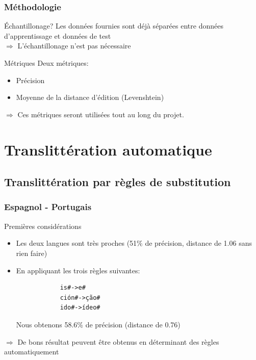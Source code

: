 \documentclass{beamer}
\begin{document}
\begin{frame}
\frametitle{Méthodologie}

	\begin{block}{Échantillonage?}
	Les données fournies sont déjà séparées entre données d'apprentissage et données de test\\
	$\Longrightarrow$ L'échantillonage n'est pas nécessaire
	\end{block}

	\begin{block}{Métriques}
	Deux métriques:
		\begin{itemize}
            \item Précision
            \item Moyenne de la distance d'édition (Levenshtein)
		\end{itemize}		
	\end{block}
	
	\begin{alertblock}{}
	$\Longrightarrow$ Ces métriques seront utilisées tout au long du projet.
	\end{alertblock}	
	
\end{frame}

\section{Translittération automatique}

\begin{frame}
\end{frame}

\subsection{Translittération par règles de substitution}

\begin{frame}[fragile]
	\frametitle{Espagnol - Portugais}

	\begin{block}{Premières considérations}
		\begin{itemize}
		\item Les deux langues sont très proches (51\% de précision, distance de 1.06 sans rien faire)
		\item En appliquant les trois règles suivantes: {\scriptsize \begin{verbatim}
			is#->e#
			ción#->ção#
			ido#->ídeo#
			\end{verbatim}}
            Nous obtenons 58.6\% de précision (distance de 0.76)
		\end{itemize}
	\end{block}

	\begin{alertblock}{}
	$\Longrightarrow$ De bons résultat peuvent être obtenus en déterminant des règles automatiquement 
	\end{alertblock}
\end{frame}
\end{document}
